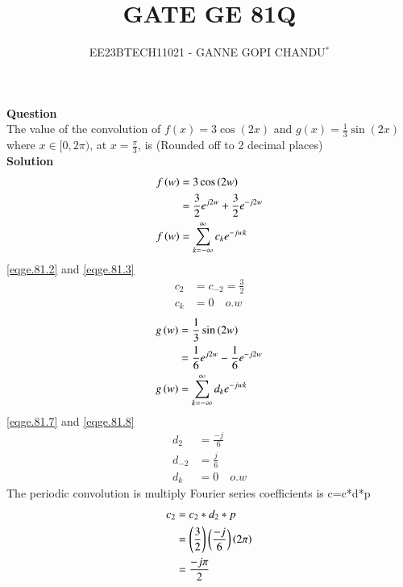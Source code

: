 \documentclass[journal,12pt,twocolumn]{IEEEtran}
\theoremstyle{remark}
\begin{document}

\vspace{3cm}
\title{GATE GE 81Q}
\author{EE23BTECH11021 - GANNE GOPI CHANDU$^{*}$%
}
\maketitle
\bigskip
\renewcommand{\thefigure}{\theenumi}
\renewcommand{\thetable}{\theenumi}

\textbf{Question}\\
The value of the convolution of $f(x) = 3\cos(2x)$ and $g(x) = \frac{1}{3}\sin(2x)$ where $x \in [0, 2\pi)$, at $x = \frac{\pi}{3}$, is (Rounded off to 2 decimal places)\\
\textbf{Solution}\\
\begin{align}
    f\left(w\right)&=3\cos\left(2w\right)\\
    &=\frac{3}{2}e^{j2w}+\frac{3}{2}e^{-j2w} \label{eqge.81.2}\\
    f\left(w\right)&=\sum_{k=-\infty}^{\infty}c_k e^{-j w k} \label{eqge.81.3}
\end{align}
    \eqref{eqge.81.2} and \eqref{eqge.81.3} \\
\begin{align}
   c_2&=c_{-2}=\frac{3}{2}\\
   c_{k}&=0 \quad{o.w}
\end{align}
\begin{align}
    g\left(w\right)&=\frac{1}{3}\sin\left(2w\right)\\
    &=\frac{1}{6}e^{j2w}-\frac{1}{6}e^{-j2w} \label{eqge.81.7} \\
    g\left(w\right)&=\sum_{k=-\infty}^{\infty}d_{k} e^{-j w k} \label{eqge.81.8}
\end{align}
    \eqref{eqge.81.7} and \eqref{eqge.81.8} \\
\begin{align}
   d_{2}&=\frac{-j}{6}\\
   d_{-2}&=\frac{j}{6}\\
   d_{k}&=0 \quad{o.w}
\end{align}
The periodic convolution is multiply Fourier series coefficients is
c=c*d*p\\
\begin{align}
    c_{2}&=c_{2}*d_{2}*p\\
    &=\left(\frac{3}{2}\right)\left(\frac{-j}{6}\right)\left(2\pi\right)\\
    &=\frac{-j\pi}{2}
\end{align}
\end{document}
